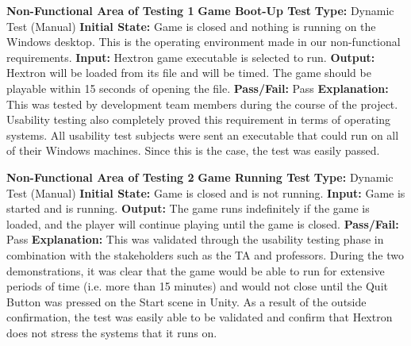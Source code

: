 \documentclass[12pt, titlepage]{article}
\begin{document}
\noindent \textbf{Non-Functional Area of Testing 1}
\newline
\textbf{Game Boot-Up Test}
\newline 
\textbf{Type:} Dynamic Test (Manual)
\newline
\textbf{Initial State:} Game is closed and nothing is running on the Windows desktop. This is the operating environment made in our non-functional requirements. 
\newline
\textbf{Input:} Hextron game executable is selected to run. 
\newline 
\textbf{Output:} Hextron will be loaded from its file and will be timed. The game should be playable within 15 seconds of opening the file.
\newline 
\textbf{Pass/Fail:} Pass
\newline
\textbf{Explanation:} This was tested by development team members during the course of the project. Usability testing also completely proved this requirement in terms of operating systems. All usability test subjects were sent an executable that could run on all of their Windows machines. Since this is the case, the test was easily passed. \newline \newline  

\noindent \textbf{Non-Functional Area of Testing 2}
\newline 
\textbf{Game Running Test}
\newline
\textbf{Type:} Dynamic Test (Manual)
\newline 
\textbf{Initial State:} Game is closed and is not running. 
\newline
\textbf{Input:} Game is started and is running.
\newline
\textbf{Output:} The game runs indefinitely if the game is loaded, and the player will continue playing until the game is closed.
\newline
\textbf{Pass/Fail:} Pass
\newline
\textbf{Explanation:} This was validated through the usability testing phase in combination with the stakeholders such as the TA and professors. During the two demonstrations, it was clear that the game would be able to run for extensive periods of time (i.e. more than 15 minutes) and would not close until the Quit Button was pressed on the Start scene in Unity. As a result of the outside confirmation, the test was easily able to be validated and confirm that Hextron does not stress the systems that it runs on. \newline \newline 
\end{document}
